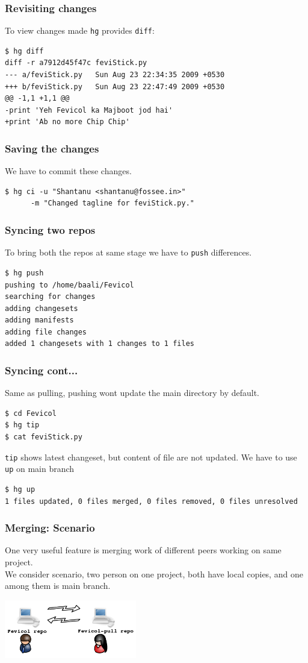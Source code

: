 \documentclass[14pt,compress]{beamer}
\newcounter{time}
\newcommand{\inctime}[1]{\addtocounter{time}{#1}{\tiny \thetime\ m}}
\newcommand{\typ}[1]{\lstinline{#1}}
\begin{document}
\begin{frame}[fragile]
  \frametitle{Revisiting changes}
  To view changes made \typ{hg} provides \typ{diff}:
\begin{lstlisting}
$ hg diff
diff -r a7912d45f47c feviStick.py
--- a/feviStick.py   Sun Aug 23 22:34:35 2009 +0530
+++ b/feviStick.py   Sun Aug 23 22:47:49 2009 +0530
@@ -1,1 +1,1 @@
-print 'Yeh Fevicol ka Majboot jod hai'
+print 'Ab no more Chip Chip'
  \end{lstlisting} %
\end{frame}

\begin{frame}[fragile]
  \frametitle{Saving the changes}
  We have to commit these changes.
  \begin{lstlisting}
$ hg ci -u "Shantanu <shantanu@fossee.in>" 
      -m "Changed tagline for feviStick.py."
  \end{lstlisting} %
\end{frame}

\begin{frame}[fragile]
  \frametitle{Syncing two repos}
  To bring both the repos at same stage we have to \typ{push} differences.
  \begin{lstlisting}
$ hg push 
pushing to /home/baali/Fevicol
searching for changes
adding changesets
adding manifests
adding file changes
added 1 changesets with 1 changes to 1 files
  \end{lstlisting} %
\end{frame}

\begin{frame}[fragile]
  \frametitle{Syncing cont...}
  Same as pulling, pushing wont update the main directory by default.
  \begin{lstlisting}
$ cd Fevicol
$ hg tip    
$ cat feviStick.py
  \end{lstlisting}
  \typ{tip} shows latest changeset, but content of file are not updated. We have to use \typ{up} on main branch
  \begin{lstlisting}
$ hg up
1 files updated, 0 files merged, 0 files removed, 0 files unresolved    
  \end{lstlisting} %
  \inctime{15}
\end{frame}

\begin{frame}[fragile]
  \frametitle{Merging: Scenario}
  One very useful feature is merging work of different peers working on same project.\\
  We consider scenario, two person on one project, both have local copies, and one among them is main branch.\\
  \begin{center}
    \includegraphics[height=1in, interpolate=true]{scenario}
  \end{center}  
\end{frame}
\end{document}
